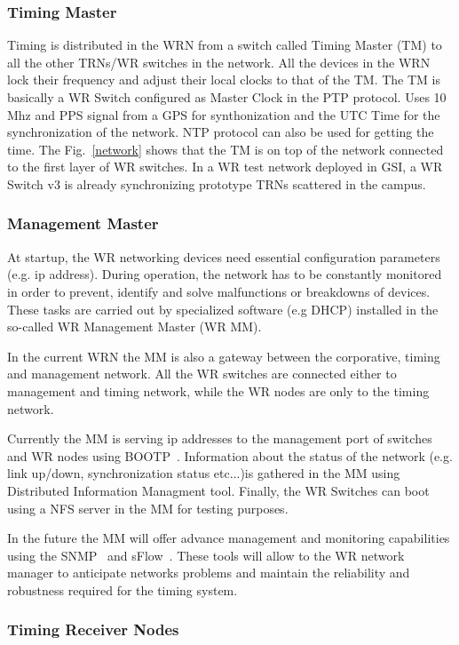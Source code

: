 \subsubsection{Timing Master}
Timing is distributed in the WRN from a switch called Timing Master (TM) to all
the other TRNs/WR switches in the network. All the devices in the WRN lock their frequency 
and adjust their local clocks to that of the TM. The TM is basically a WR Switch
configured as Master Clock in the PTP protocol. Uses 10 Mhz and PPS signal from
a GPS for synthonization and the UTC Time for the synchronization of the
network. NTP protocol can also be used for getting the time.
The Fig.~\ref{network} shows that the TM is on top of the network
connected to the first layer of WR switches. In a WR test network deployed in
GSI, a WR Switch v3 is already synchronizing prototype TRNs scattered in the
campus.  

\subsubsection{Management Master}

At startup, the WR networking devices need essential configuration parameters (e.g. ip
address). During operation, the network has to be constantly monitored in
order to prevent, identify and solve malfunctions or breakdowns of devices. 
These tasks are carried out by specialized software (e.g DHCP) installed in the
so-called WR Management Master (WR MM). 

In the current WRN the MM is also a gateway between the corporative, timing and management 
network. All the WR switches are connected either to management and timing
network, while the WR nodes are only to the timing network. 

Currently the MM is serving ip addresses to the management port of switches and WR
nodes using BOOTP~\cite{bootp}. Information about the status of the network (e.g.
link up/down, synchronization status etc...)is gathered in the MM using Distributed Information Managment
tool. Finally, the WR Switches can boot using a NFS server in the MM for testing
purposes. 

In the future the MM will offer advance management and monitoring capabilities
using the SNMP~\cite{snmp} and sFlow~\cite{sflow}. These tools will allow to the 
WR network manager to anticipate networks problems and maintain the reliability
and robustness required for the timing system.


\subsubsection{Timing Receiver Nodes}

